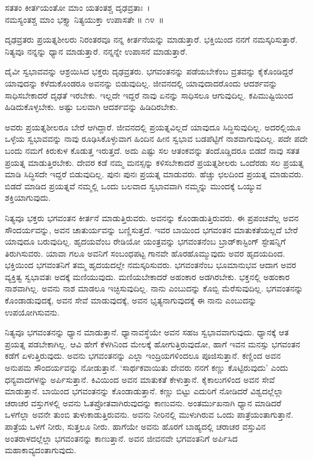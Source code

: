 \begin{shloka}
ಸತತಂ ಕೀರ್ತಯಂತೋ ಮಾಂ ಯತಂತಶ್ಚ ದೃಢವ್ರತಾಃ~।\\ನಮಸ್ಯಂತಶ್ಚ ಮಾಂ ಭಕ್ತ್ಯಾ ನಿತ್ಯಯುಕ್ತಾ ಉಪಾಸತೇ \hfill॥ ೧೪~॥
\end{shloka}

\begin{artha}
ದೃಢವ್ರತರು ಪ್ರಯತ್ನಶೀಲರು ನಿರಂತರವೂ ನನ್ನ ಕೀರ್ತನೆಯನ್ನು ಮಾಡುತ್ತಾರೆ. ಭಕ್ತಿಯಿಂದ ನನಗೆ ನಮಸ್ಕರಿಸುತ್ತಾರೆ. ನಿತ್ಯವೂ ನನ್ನನ್ನು ಧ್ಯಾನ ಮಾಡುತ್ತಾರೆ. ನನ್ನನ್ನೇ ಉಪಾಸನೆ ಮಾಡುತ್ತಾರೆ.
\end{artha}

\newpage

ದೈವೀ ಸ್ವಭಾವವನ್ನು ಆಶ್ರಯಿಸಿದ ಭಕ್ತರು ದೃಢವ್ರತರು. ಭಗವಂತನನ್ನು ಪಡೆಯಬೇಕೆಂಬ ವ್ರತವನ್ನು ಕೈಕೊಂಡಿದ್ದರೆ ಯಾವುದನ್ನು ಕಳೆದುಕೊಂಡರೂ ಅವನನ್ನು ಬಿಡುವುದಿಲ್ಲ. ಜೀವನದಲ್ಲಿ ಯಾವುದಾದರೊಂದು ಆದರ್ಶವನ್ನು ಸಾಧಿಸಬೇಕಾದರೆ ದೃಢತೆ ಇರಬೇಕು. ಇಲ್ಲದೇ ಇದ್ದರೆ ನಾವು ಏನನ್ನು ಸಾಧಿಸಲೂ ಆಗುವುದಿಲ್ಲ. ಕಪಿಮುಷ್ಟಿಯಿಂದ ಹಿಡಿದುಕೊಳ್ಳಬೇಕು. ಅಷ್ಟು ಬಲವಾಗಿ ಆದರ್ಶವನ್ನು ಹಿಡಿದಿರಬೇಕು.

ಅವರು ಪ್ರಯತ್ನಶೀಲರೂ ಬೇರೆ ಆಗಿದ್ದಾರೆ. ಜೀವನದಲ್ಲಿ ಪ್ರಯತ್ನವಿಲ್ಲದೆ ಯಾವುದೂ ಸಿದ್ಧಿಸುವುದಿಲ್ಲ. ಅದರಲ್ಲಿಯೂ ಒಳ್ಳೆಯ ಸ್ವಭಾವವನ್ನು ನಾವು ರೂಢಿಸಿಕೊಳ್ಳುವಾಗ ಹಿಂದಿನ ಹೀನ ಸ್ವಭಾವ ಬಡಪೆಟ್ಟಿಗೆ ನಾಶವಾಗುವುದಿಲ್ಲ. ಪದೇ ಪದೇ ಬಂದು ನಮಗೆ ಕಿರುಕುಳ ಕೊಡುತ್ತ ಇರುತ್ತದೆ. ಅದು ಎಷ್ಟು ಸಲ ಆತಂಕವನ್ನು ತಂದೊಡ್ಡಿದರೂ ಬಿಡದೆ ನಾವು ಸತತ ಪ್ರಯತ್ನ ಮಾಡುತ್ತಿರಬೇಕು. ದೇವರ ಕಡೆ ನಮ್ಮ ಮನಸ್ಸನ್ನು ಕಳಿಸಬೇಕಾದರೆ ಪ್ರಯತ್ನಶೀಲರು ಒಂದೆರಡು ಸಲ ಪ್ರಯತ್ನ ಮಾಡಿ ಸಿದ್ಧಿಸದೇ ಇದ್ದರೆ ಬಿಡುವುದಿಲ್ಲ. ಪುನಃ ಪುನಃ ಪ್ರಯತ್ನ ಮಾಡುವರು. ಹೆಚ್ಚು ಛಲದಿಂದ ಪ್ರಯತ್ನ ಮಾಡುವರು. ಬಿಡದೆ ಮಾಡಿದ ಪ್ರಯತ್ನವೆ ನಮ್ಮಲ್ಲಿ ಒಂದು ಬಲವಾದ ಸ್ವಭಾವವಾಗಿ ನಮ್ಮನ್ನು ಮುಂದಕ್ಕೆ ಒಯ್ಯುವ ಶಕ್ತಿಯಾಗುವುದು.

ನಿತ್ಯವೂ ಭಕ್ತರು ಭಗವಂತನ ಕೀರ್ತನೆ ಮಾಡುತ್ತಿರುವರು. ಅವನನ್ನು ಕೊಂಡಾಡುತ್ತಿರುವರು. ಈ ಪ್ರಪಂಚವೆಲ್ಲ ಅವನ ಸೌಂದರ್ಯವನ್ನು, ಅವನ ಚಾತುರ್ಯವನ್ನು ಬಣ್ಣಿಸುತ್ತದೆ. ಇವರ ಬಾಯಿಂದ ಭಗವಂತನ ಮಾತುಕತೆಯಲ್ಲದೆ ಬೇರೆ ಯಾವುದೂ ಬರುವುದಿಲ್ಲ. ಹೃದಯವೆಂಬ ರೇಡಿಯೋ ಯಂತ್ರವನ್ನು ಭಗವಂತನೆಂಬ ಬ್ರಾಡ್​ಕಾಸ್ಟಿಂಗ್ ಸ್ಟೇಷನ್ನಿಗೆ ತಿರುಗಿಸುವರು. ಯಾವಾ ಗಲೂ ಅವನಿಗೆ ಸಂಬಂಧಪಟ್ಟ ಗಾನವೇ ಹೊರಹೊಮ್ಮುವುದು ಅವರ ಹೃದಯದಿಂದ. ಭಕ್ತಿಯಿಂದ ಭಗವಂತನಿಗೆ ತಮ್ಮ ಹೃದಯದಲ್ಲೇ ನಮಸ್ಕರಿಸುವರು. ಭಗವಂತನೆಂಬ ಭೂಮಾನುಭವ ಆದಾಗ ಅವರ ವ್ಯಕ್ತಿತ್ವ ಸ್ವಭಾವತಃ ಅದಕ್ಕೆ ಮಣಿಯುವುದು. ಮಣಿಯಬೇಕಾದರೆ ಅಹಂಕಾರ ಅಡಗಿರಬೇಕು. ಭಕ್ತನಲ್ಲಿ ಅಹಂಕಾರ ನಾಶವಾಗಿಲ್ಲ. ಅವನು ನಾಶ ಮಾಡಲೂ ಇಚ್ಛಿಸುವುದಿಲ್ಲ. ನಾನು ಎಂಬುದನ್ನು ಕೊಬ್ಬಿ ಮೆರೆಸುವುದಿಲ್ಲ. ಭಗವಂತನನ್ನು ಕೊಂಡಾಡುವುದಕ್ಕೆ, ಅವನ ಸೇವೆ ಮಾಡುವುದಕ್ಕೆ, ಅವನ ಭೃತ್ಯನಾಗುವುದಕ್ಕೆ ಈ ನಾನು ಎಂಬುದನ್ನು ಉಪಯೋಗಿಸುವನು.

ನಿತ್ಯವೂ ಭಗವಂತನನ್ನು ಧ್ಯಾನ ಮಾಡುತ್ತಾನೆ. ಧ್ಯಾನಾವಸ್ಥೆಯೇ ಅವನ ಸಹಜ ಸ್ವಭಾವವಾಗುವುದು. ಧ್ಯಾನಕ್ಕೆ ಆತ ಪ್ರಯತ್ನ ಪಡಬೇಕಾಗಿಲ್ಲ. ಆವಿ ಹೇಗೆ ಕೆಳಗಿನಿಂದ ಮೇಲಕ್ಕೆ ಹೋಗುತ್ತಿರುವುದೋ, ಹಾಗೆ ಇವನ ಮನಸ್ಸು ಭಗವಂತನ ಕಡೆಗೆ ಏಳುತ್ತಿರುವುದು. ಅವನು ಭಗವಂತನನ್ನು ಎಲ್ಲಾ ಇಂದ್ರಿಯಗಳಿಂದಲೂ ಪೂಜಿಸುತ್ತಾನೆ. ಕಣ್ಣಿಂದ ಅವನ ಅನುಪಮ ಸೌಂದರ್ಯವನ್ನು ನೋಡುತ್ತಾನೆ. ‘ಸಾರ್ಥಕವಾಯಿತು ದೇವರು ನನಗೆ ಕಣ್ಣು ಕೊಟ್ಟಿರುವುದು’ ಎಂದು ಧನ್ಯವಾದಗಳನ್ನು ಅರ್ಪಿಸುತ್ತಾನೆ. ಕಿವಿಯಿಂದ ಅವನ ಮಾತುಕತೆ ಕೇಳುತ್ತಾನೆ. ಕೈಕಾಲುಗಳಿಂದ ಅವನ ಸೇವೆ ಮಾಡುತ್ತಾನೆ. ಬಾಯಿಂದ ಭಗವಂತನನ್ನು ಕೊಂಡಾಡುತ್ತಾನೆ. ಕಣ್ಣು ಬಿಟ್ಟು ಎದುರಿಗೆ ನೋಡಿದರೆ ವಿಶ್ವದಲ್ಲೆಲ್ಲಾ ಚರಾಚರ ವಸ್ತುಗಳಲ್ಲಿ ಅವನು ಓತಪ್ರೋತವಾಗಿರುವುದನ್ನು ಕಾಣುವನು. ಅಂತರ್ಮುಖನಾಗಿ ಧ್ಯಾನ ಮಾಡಿದರೆ ಒಳಗೆಲ್ಲಾ ಅವನೇ ತುಂಬಿ ತುಳುಕಾಡುತ್ತಿರುವನು. ಅವನು ನೀರಿನಲ್ಲಿ ಮುಳುಗಿರುವ ಒಂದು ಪಾತ್ರೆಯಂತಾಗುತ್ತಾನೆ. ಪಾತ್ರೆಯ ಒಳಗೆ ನೀರು, ಸುತ್ತಲೂ ನೀರು. ಹಾಗೆಯೇ ಅವನು ಹೊರಗೆ ಬಾಹ್ಯದಲ್ಲಿ ಚರಾಚರ ವಸ್ತುವಿನ ಅಂತರಾಳದಲ್ಲೆಲ್ಲಾ ಭಗವಂತನನ್ನು ಕಾಣುತ್ತಾನೆ. ಅವನ ಜೀವನವೇ ಭಗವಂತನಿಗೆ ಅರ್ಪಿಸಿದ ಮಹಾಕಾವ್ಯದಂತಾಗುವುದು.

